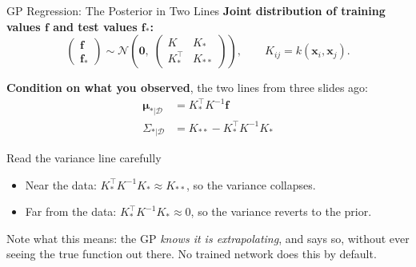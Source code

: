 \documentclass[aspectratio=169,11pt]{beamer}
\newcommand{\emphc}[1]{\textcolor{harvardcrimson}{#1}}
\newcommand{\x}{\bm{x}}
\begin{document}
\begin{frame}{GP Regression: The Posterior in Two Lines}
\textbf{Joint distribution of training values $\bm f$ and test values $\bm f_*$:}
\[
\begin{pmatrix} \bm f \\ \bm f_* \end{pmatrix} \sim
\mathcal{N}\!\left(\bm 0,\;
\begin{pmatrix} K & K_* \\ K_*^\top & K_{**} \end{pmatrix}\right),
\qquad K_{ij} = k(\x_i, \x_j).
\]

\textbf{Condition on what you observed}, the two lines from three slides ago:
\begin{align*}
\bm\mu_{*|\mathcal{D}} &= K_*^\top K^{-1} \bm f\\
\Sigma_{*|\mathcal{D}} &= K_{**} - K_*^\top K^{-1} K_*
\end{align*}

\vspace{0.15cm}
\begin{alertblock}{Read the variance line carefully}
\begin{itemize}\itemsep1pt
  \item Near the data: $K_*^\top K^{-1} K_* \approx K_{**}$, so the variance \emphc{collapses}.
  \item Far from the data: $K_*^\top K^{-1} K_* \approx 0$, so the variance \emphc{reverts to the prior}.
\end{itemize}
\vspace{2pt}
Note what this means: the GP \emph{knows it is extrapolating}, and says so, without ever seeing the true function out there. No trained network does this by default.
\end{alertblock}
\end{frame}
\end{document}

